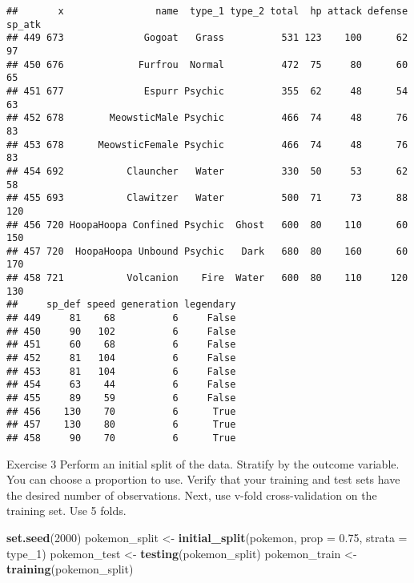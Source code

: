 \documentclass[]{article}
\newenvironment{Shaded}{\begin{snugshade}}{\end{snugshade}}
\newcommand{\DataTypeTok}[1]{\textcolor[rgb]{0.13,0.29,0.53}{#1}}
\newcommand{\DecValTok}[1]{\textcolor[rgb]{0.00,0.00,0.81}{#1}}
\newcommand{\FloatTok}[1]{\textcolor[rgb]{0.00,0.00,0.81}{#1}}
\newcommand{\KeywordTok}[1]{\textcolor[rgb]{0.13,0.29,0.53}{\textbf{#1}}}
\newcommand{\NormalTok}[1]{#1}
\newcommand{\OperatorTok}[1]{\textcolor[rgb]{0.81,0.36,0.00}{\textbf{#1}}}
\newcommand{\StringTok}[1]{\textcolor[rgb]{0.31,0.60,0.02}{#1}}
\begin{document}
\begin{Shaded}
\end{Shaded}

\begin{verbatim}
##       x                name  type_1 type_2 total  hp attack defense sp_atk
## 449 673              Gogoat   Grass          531 123    100      62     97
## 450 676             Furfrou  Normal          472  75     80      60     65
## 451 677              Espurr Psychic          355  62     48      54     63
## 452 678        MeowsticMale Psychic          466  74     48      76     83
## 453 678      MeowsticFemale Psychic          466  74     48      76     83
## 454 692           Clauncher   Water          330  50     53      62     58
## 455 693           Clawitzer   Water          500  71     73      88    120
## 456 720 HoopaHoopa Confined Psychic  Ghost   600  80    110      60    150
## 457 720  HoopaHoopa Unbound Psychic   Dark   680  80    160      60    170
## 458 721           Volcanion    Fire  Water   600  80    110     120    130
##     sp_def speed generation legendary
## 449     81    68          6     False
## 450     90   102          6     False
## 451     60    68          6     False
## 452     81   104          6     False
## 453     81   104          6     False
## 454     63    44          6     False
## 455     89    59          6     False
## 456    130    70          6      True
## 457    130    80          6      True
## 458     90    70          6      True
\end{verbatim}

Exercise 3 Perform an initial split of the data. Stratify by the outcome
variable. You can choose a proportion to use. Verify that your training
and test sets have the desired number of observations. Next, use v-fold
cross-validation on the training set. Use 5 folds.

\begin{Shaded}
\begin{Highlighting}[]
\KeywordTok{set.seed}\NormalTok{(}\DecValTok{2000}\NormalTok{)}
\NormalTok{pokemon_split <-}\StringTok{ }\KeywordTok{initial_split}\NormalTok{(pokemon, }\DataTypeTok{prop =} \FloatTok{0.75}\NormalTok{, }\DataTypeTok{strata =}\NormalTok{ type_}\DecValTok{1}\NormalTok{)}
\NormalTok{pokemon_test <-}\StringTok{ }\KeywordTok{testing}\NormalTok{(pokemon_split)}
\NormalTok{pokemon_train <-}\StringTok{ }\KeywordTok{training}\NormalTok{(pokemon_split)}
\end{Highlighting}
\end{Shaded}
\end{document}
